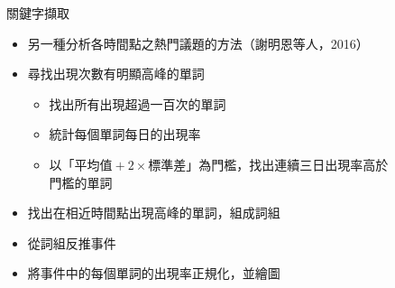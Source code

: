 \documentclass{beamer}
\begin{document}
\begin{CJK}{UTF8}{bkai}
\begin{frame}{關鍵字擷取}
\begin{itemize}
\item 另一種分析各時間點之熱門議題的方法（謝明恩等人，2016）
\item 尋找出現次數有明顯高峰的單詞
  \begin{itemize}
  \item 找出所有出現超過一百次的單詞
  \item 統計每個單詞每日的出現率
  \item 以「$\text{平均值}+2\times\text{標準差}$」為門檻，找出連續三日出現率高於\\門檻的單詞
  \end{itemize}
\item 找出在相近時間點出現高峰的單詞，組成詞組
\item 從詞組反推事件
\item 將事件中的每個單詞的出現率正規化，並繪圖
\end{itemize}
\end{frame}


\end{CJK}
\end{document}
